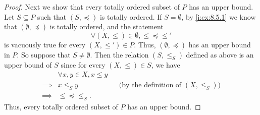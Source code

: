 \begin{proof}
  Next we show that every totally ordered subset of \(P\) has an upper bound.
  Let \(S \subseteq P\) such that \((S, \preceq)\) is totally ordered.
  If \(S = \emptyset\), by \cref{i:ex:8.5.1} we know that \((\emptyset, \preceq)\) is totally ordered, and the statement
  \[
    \forall (X, \leq) \in \emptyset, \leq \preceq \leq'
  \]
  is vacuously true for every \((X, \leq') \in P\).
  Thus, \((\emptyset, \preceq)\) has an upper bound in \(P\).
  So suppose that \(S \neq \emptyset\).
  Then the relation \((S, \leq_S)\) defined as above is an upper bound of \(S\) since for every \((X, \leq) \in S\), we have
  \begin{align*}
             & \forall x, y \in X, x \leq y                                                    \\
    \implies & x \leq_S y                   &  & \text{(by the definition of \((X, \leq_S)\))} \\
    \implies & \leq \preceq \leq_S.
  \end{align*}
  Thus, every totally ordered subset of \(P\) has an upper bound.


\end{proof}
